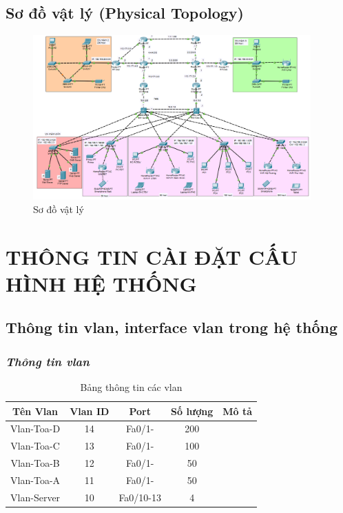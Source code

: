 \documentclass[12pt, a4paper]{article}
\begin{document}
	\subsection{Sơ đồ vật lý (Physical Topology)}
	\begin{figure}[H]
		\centering
		\includegraphics[width=0.95\textwidth]{sodovatly.png}
		\caption{Sơ đồ vật lý} 
	\end{figure}
	\newpage
	\section{THÔNG TIN CÀI ĐẶT CẤU HÌNH HỆ THỐNG}
	\subsection{Thông tin vlan, interface vlan trong hệ thống} 
	\subsubsection{\textit{Thông tin vlan}}
	\begin{table}[h]
		\centering
		\caption{Bảng thông tin các vlan}
		\begin{tabular}{|c|c|c|c|c|}
			\hline
			\textbf{Tên Vlan} & \textbf{Vlan ID} & \textbf{Port} & \textbf{Số lượng} & \textbf{Mô tả} \\
			\hline
			Vlan-Toa-D & 14 & Fa0/1- & 200 & \\
			\hline
			Vlan-Toa-C & 13 & Fa0/1- & 100 & \\
			\hline
			Vlan-Toa-B & 12 & Fa0/1- & 50 & \\
			\hline
			Vlan-Toa-A & 11 & Fa0/1- & 50 & \\
			\hline
			Vlan-Server & 10 & Fa0/10-13 & 4 & \\
			\hline
		\end{tabular}
	\end{table}
\end{document}
